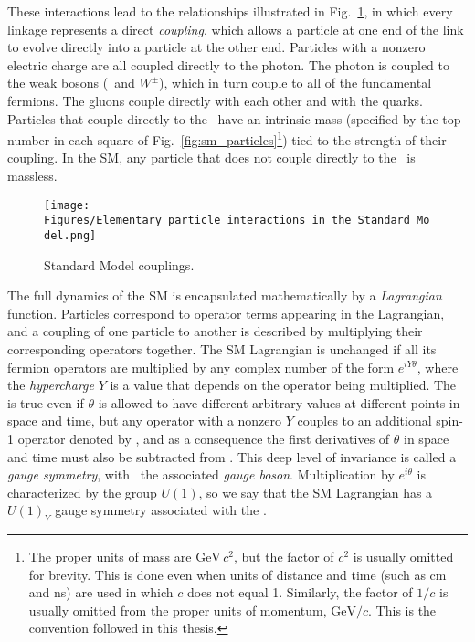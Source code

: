 These interactions lead to the relationships illustrated in Fig.~\ref{fig:sm_interactions}, in which every linkage represents
a direct \textit{coupling}, which allows a particle at one end of the link to evolve directly into a particle at the other end.
Particles with a nonzero electric charge are all coupled directly to the photon. The photon is coupled to the weak bosons
(\PZ\ and $W^\pm$), which in turn couple to all of the fundamental fermions.
The gluons couple directly with each other and with the quarks.
Particles that couple directly to the \PH\ have an intrinsic mass (specified by the top number in each square of Fig.~\ref{fig:sm_particles}\footnote{The
proper units of mass are $\mathrm{GeV}\,c^{2}$, but the factor of $c^{2}$ is usually omitted for brevity. This is done even when units of distance and
time (such as cm and ns) are used in which $c$ does not equal 1. Similarly, the factor of $1/c$ is usually omitted from the proper units of momentum,
$\mathrm{GeV}/c$. This is the convention followed in this thesis.}) tied to the strength of their coupling.
In the SM, any particle that does not couple directly to the \PH\ is massless.

\begin{figure}[hbtp]
  \begin{center}
    \texttt{[image: Figures/Elementary\_particle\_interactions\_in\_the\_Standard\_Model.png]}
    \caption{
      Standard Model couplings.
    }
    \label{fig:sm_interactions}
  \end{center}
\end{figure}

The full dynamics of the SM is encapsulated mathematically by a \textit{Lagrangian} function. Particles correspond to operator
terms appearing in the Lagrangian, and a coupling of one particle to another is described by multiplying their
corresponding operators together. The SM Lagrangian is unchanged
if all its fermion operators are multiplied by any complex number of the form $e^{iY\theta}$, where the \textit{hypercharge} $Y$ is a value that depends
on the operator being multiplied. The is true even if $\theta$ is allowed to have different arbitrary values at
different points in space and time, but any operator with a nonzero $Y$ couples to an additional spin-1 operator denoted by \PB,
and as a consequence the first derivatives of $\theta$ in space and time must also be subtracted from \PB.
This deep level of invariance is called a \textit{gauge symmetry}, with \PB\ the associated \textit{gauge boson}.
Multiplication by $e^{i\theta}$ is characterized by the group $U(1)$, so we say that the SM Lagrangian has a
$U(1)_{Y}$ gauge symmetry associated with the \PB.

